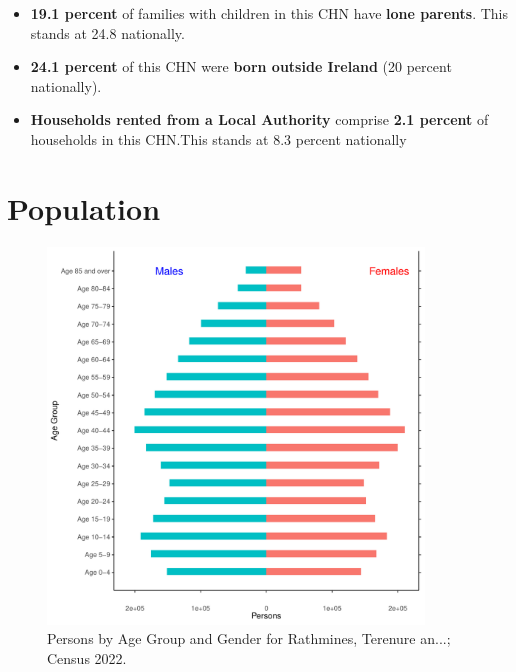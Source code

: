 \documentclass{article}
\begin{document}
\begin{itemize}
\item \textbf{19.1 percent} of families with children in this CHN have \textbf{lone parents}. This stands at 24.8 nationally.

\item \textbf{24.1 percent} of this CHN were \textbf{born outside Ireland} (20 percent nationally).

\item \textbf{Households rented from a Local Authority} comprise \textbf{2.1 percent} of households in this CHN.This stands at 8.3 percent nationally

\end{itemize}

\pagebreak

\section{Population} 
\label{sect:Pop}

\begin{figure}[h]
	\centering
	\includegraphics[width = 100mm]{../figures/PyramidPlot.pdf}
	\caption{Persons by Age Group and Gender for Rathmines, Terenure an...; Census 2022.}
	\label{fig:2ae19629-1a6a-13a3-e055-000000000001}
	\end{figure}
\end{document}
